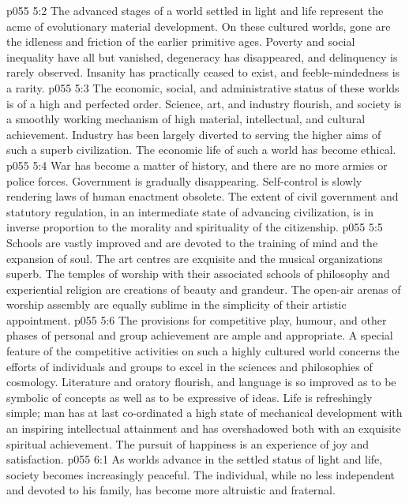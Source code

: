 \vs p055 5:2 The advanced stages of a world settled in light and life represent the acme of evolutionary material development. On these cultured worlds, gone are the idleness and friction of the earlier primitive ages. Poverty and social inequality have all but vanished, degeneracy has disappeared, and delinquency is rarely observed. Insanity has practically ceased to exist, and feeble\hyp{}mindedness is a rarity.
\vs p055 5:3 The economic, social, and administrative status of these worlds is of a high and perfected order. Science, art, and industry flourish, and society is a smoothly working mechanism of high material, intellectual, and cultural achievement. Industry has been largely diverted to serving the higher aims of such a superb civilization. The economic life of such a world has become ethical.
\vs p055 5:4 War has become a matter of history, and there are no more armies or police forces. Government is gradually disappearing. Self\hyp{}control is slowly rendering laws of human enactment obsolete. The extent of civil government and statutory regulation, in an intermediate state of advancing civilization, is in inverse proportion to the morality and spirituality of the citizenship.
\vs p055 5:5 Schools are vastly improved and are devoted to the training of mind and the expansion of soul. The art centres are exquisite and the musical organizations superb. The temples of worship with their associated schools of philosophy and experiential religion are creations of beauty and grandeur. The open\hyp{}air arenas of worship assembly are equally sublime in the simplicity of their artistic appointment.
\vs p055 5:6 The provisions for competitive play, humour, and other phases of personal and group achievement are ample and appropriate. A special feature of the competitive activities on such a highly cultured world concerns the efforts of individuals and groups to excel in the sciences and philosophies of cosmology. Literature and oratory flourish, and language is so improved as to be symbolic of concepts as well as to be expressive of ideas. Life is refreshingly simple; man has at last co\hyp{}ordinated a high state of mechanical development with an inspiring intellectual attainment and has overshadowed both with an exquisite spiritual achievement. The pursuit of happiness is an experience of joy and satisfaction.
\vs p055 6:1 As worlds advance in the settled status of light and life, society becomes increasingly peaceful. The individual, while no less independent and devoted to his family, has become more altruistic and fraternal.
